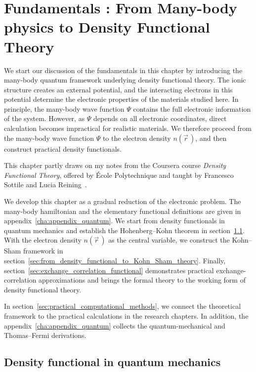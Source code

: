\chapter[Fundamentals \textRoman{1}: From Many-Body Physics to DFT]{Fundamentals : From Many-body physics to Density Functional Theory}
\label{cha:fundamentals_a}

We start our discussion of the fundamentals in this chapter by introducing the many-body quantum framework underlying density functional theory.
The ionic structure creates an external potential, and the interacting electrons in this potential determine the electronic properties of the materials studied here.
In principle, the many-body wave function $\Psi$ contains the full electronic information of the system.
However, as $\Psi$ depends on all electronic coordinates, direct calculation becomes impractical for realistic materials.
We therefore proceed from the many-body wave function $\Psi$ to the electron density $n(\vec{r}\,)$, and then construct practical density functionals.

This chapter partly draws on my notes from the Coursera course \textit{Density Functional Theory}, offered by École Polytechnique and taught by Francesco Sottile and Lucia Reining~\cite{sottile_reining_dft_coursera}.

We develop this chapter as a gradual reduction of the electronic problem.
The many-body hamiltonian and the elementary functional definitions are given in appendix~\ref{cha:appendix_quantum}.
We start from density functionals in quantum mechanics and establish the Hohenberg--Kohn theorem in section~\ref{sec:introduction_density_functionals}.
With the electron density $n(\vec{r}\,)$ as the central variable, we construct the Kohn--Sham framework in section~\ref{sec:from_density_functional_to_Kohn_Sham_theory}.
Finally, section~\ref{sec:exchange_correlation_functional} demonstrates practical exchange-correlation approximations and brings the formal theory to the working form of density functional theory.

In section~\ref{sec:practical_computational_methods},
we connect the theoretical framework to the practical calculations in the research chapters.
In addition, the appendix~\ref{cha:appendix_quantum} collects the quantum-mechanical and Thomas--Fermi derivations.

\newpage
\FloatBarrier
\section{Density functional in quantum mechanics}
\label{sec:introduction_density_functionals}

